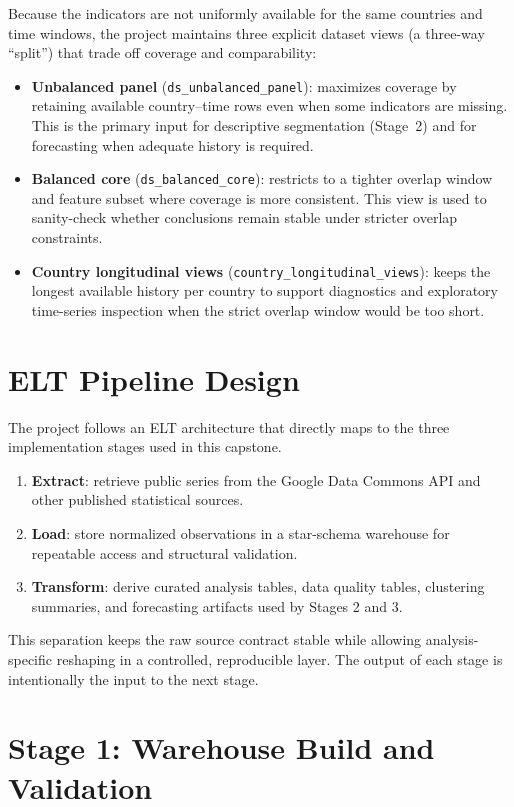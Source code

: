 \documentclass[a4paper]{report}
\begin{document}
Because the indicators are not uniformly available for the same countries and time windows, the project maintains three explicit dataset views (a three-way ``split'') that trade off coverage and comparability:
\begin{itemize}
    \item \textbf{Unbalanced panel} (\texttt{ds\_unbalanced\_panel}): maximizes coverage by retaining available country--time rows even when some indicators are missing. This is the primary input for descriptive segmentation (Stage~2) and for forecasting when adequate history is required.
    \item \textbf{Balanced core} (\texttt{ds\_balanced\_core}): restricts to a tighter overlap window and feature subset where coverage is more consistent. This view is used to sanity-check whether conclusions remain stable under stricter overlap constraints.
    \item \textbf{Country longitudinal views} (\texttt{country\_longitudinal\_views}): keeps the longest available history per country to support diagnostics and exploratory time-series inspection when the strict overlap window would be too short.
\end{itemize}

\section{ELT Pipeline Design}
The project follows an ELT architecture that directly maps to the three implementation stages used in this capstone.
\begin{enumerate}
    \item \textbf{Extract}: retrieve public series from the Google Data Commons API and other published statistical sources.
    \item \textbf{Load}: store normalized observations in a star-schema warehouse for repeatable access and structural validation.
    \item \textbf{Transform}: derive curated analysis tables, data quality tables, clustering summaries, and forecasting artifacts used by Stages 2 and 3.
\end{enumerate}

This separation keeps the raw source contract stable while allowing analysis-specific reshaping in a controlled, reproducible layer.
The output of each stage is intentionally the input to the next stage.

\section{Stage 1: Warehouse Build and Validation}
\end{document}
